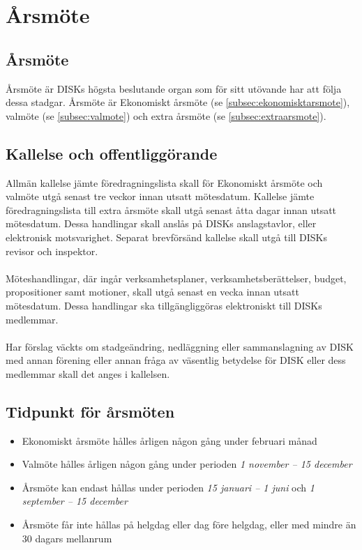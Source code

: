 \clearpage
\section{Årsmöte}
\label{sec:arsmote}

        \subsection{Årsmöte}
        \label{subsec:arsmote}
                Årsmöte är DISKs högsta beslutande organ som för sitt utövande har att följa dessa stadgar. Årsmöte är Ekonomiskt årsmöte (se \ref{subsec:ekonomisktarsmote}), valmöte (se \ref{subsec:valmote}) och extra årsmöte (se \ref{subsec:extraarsmote}).

        \subsection{Kallelse och offentliggörande}
        \label{subsec:kallelseochoffentliggorande}
                Allmän kallelse jämte föredragningslista skall för Ekonomiskt årsmöte och valmöte utgå senast tre veckor innan utsatt mötesdatum. Kallelse jämte föredragningslista till extra årsmöte skall utgå senast åtta dagar innan utsatt mötesdatum. Dessa handlingar skall anslås på DISKs anslagstavlor, eller elektronisk motsvarighet. Separat brevförsänd kallelse skall utgå till DISKs revisor och inspektor.\\ \\

                Möteshandlingar, där ingår verksamhetsplaner, verksamhetsberättelser, budget, propositioner samt motioner, skall utgå senast en vecka innan utsatt mötesdatum. Dessa handlingar ska tillgängliggöras elektroniskt till DISKs medlemmar.\\ \\

                Har förslag väckts om stadgeändring, nedläggning eller sammanslagning av DISK med annan förening eller annan fråga av väsentlig betydelse för DISK eller dess medlemmar skall det anges i kallelsen.

        \subsection{Tidpunkt för årsmöten}
        \label{subsec:tidpunktforarsmoten}
                \begin{itemize}
                \setlength{\itemsep}{0.0cm}
                \setlength{\parskip}{0.0cm}
                        \item Ekonomiskt årsmöte hålles årligen någon gång under februari månad
                        \item Valmöte hålles årligen någon gång under perioden \emph{1 november – 15 december}
                        \item Årsmöte kan endast hållas under perioden \emph{15 januari – 1 juni} och \emph{1 september – 15 december}
                        \item Årsmöte får inte hållas på helgdag eller dag före helgdag, eller med mindre än 30 dagars mellanrum
                \end{itemize}

